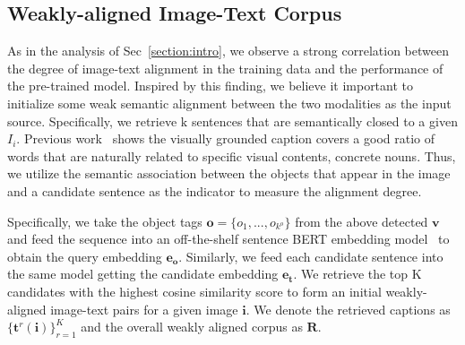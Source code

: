 \subsection{Weakly-aligned Image-Text Corpus}
\label{section:data_aug}
As in the analysis of Sec~\ref{section:intro}, we observe a strong correlation between the degree of image-text alignment in the training data and the performance of the pre-trained model.
Inspired by this finding, we believe it important to initialize some weak semantic alignment between the two modalities as the input source.
Specifically, we retrieve $\mathrm{k}$ sentences that are semantically closed to a given $I_i$. 
Previous work~\cite{tan2020vokenization} shows the visually grounded caption covers a good ratio of words that are naturally related to specific visual contents, \eg concrete nouns. 
Thus, we utilize the semantic association between the objects that appear in the image and a candidate sentence as the indicator to measure the alignment degree.

Specifically, we take the object tags $\mathbf o = \{ o_1, ..., o_{k^o} \}$ from the above detected $\mathbf v$ and feed the sequence into an off-the-shelf sentence BERT embedding model~\cite{reimers-gurevych-2019-sentence} to obtain the query embedding $\mathbf e_{\mathbf o}$.
Similarly, we feed each candidate sentence into the same model getting the candidate embedding $\mathbf e_{\mathbf t}$.
We retrieve the top $\mathrm{K}$ candidates with the highest cosine similarity score to form an initial weakly-aligned image-text pairs for a given image $\mathbf i$.
We denote the retrieved captions as $\{ \mathbf t^r (\mathbf i) \}_{r=1}^K$ and the overall weakly aligned corpus as $\mathbf R$.



